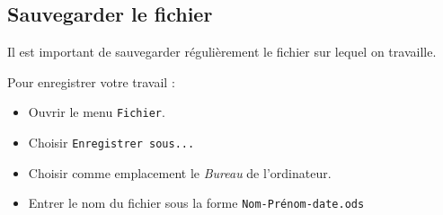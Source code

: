 \begin{center}\label{modelePage}\end{center}



\subsection{Sauvegarder le fichier}

Il est important de sauvegarder régulièrement le fichier sur lequel on travaille.

Pour enregistrer votre travail :
\begin{itemize}
\item Ouvrir le menu \texttt{Fichier}.
\item Choisir \texttt{Enregistrer sous...}
\item Choisir comme emplacement le \emph{Bureau} de l'ordinateur.
\item Entrer le nom du fichier sous la forme \texttt{Nom-Prénom-date.ods}
\end{itemize}


